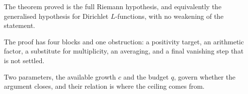\begin{keytakeaways}
\item The theorem proved is the full Riemann hypothesis, and equivalently the
generalised hypothesis for Dirichlet $L$-functions, with no weakening of the
statement.
\item The proof has four blocks and one obstruction: a positivity target, an
arithmetic factor, a substitute for multiplicity, an averaging, and a final
vanishing step that is not settled.
\item Two parameters, the available growth $c$ and the budget $q$, govern
whether the argument closes, and their relation is where the ceiling comes
from.
\end{keytakeaways}

